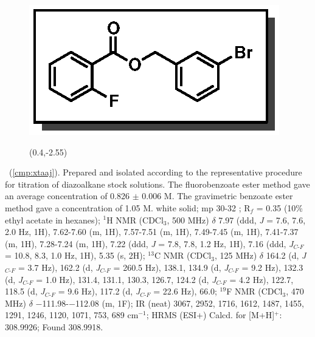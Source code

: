 \pagebreak
\begin{figure}
  \vspace{-16pt}
  \begin{center}
    \includegraphics[scale=0.8]{chp_asymmetric/images/xtaaj}
          \begin{textblock}{1}(0.4,-2.55)  \end{textblock}
  \end{center}
  \vspace{-35pt}
\end{figure}\noindent \textbf{\CMPxtaaj}\ (\ref{cmp:xtaaj}). Prepared and
isolated according to the representative procedure for titration of diazoalkane
stock solutions. The fluorobenzoate ester method gave an average concentration
of 0.826 $\pm$ 0.006 M. The gravimetric benzoate ester method gave a
concentration of 1.05 M. white solid; mp 30-32 \degc; R$_f$ = 0.35 (10\% ethyl
acetate in hexanes); $^1$H NMR (CDCl$_3$, 500 MHz) $\delta$ 7.97 (ddd, \textit{J} = 7.6,
7.6, 2.0 Hz, 1H), 7.62-7.60 (m, 1H), 7.57-7.51 (m, 1H), 7.49-7.45 (m, 1H),
7.41-7.37 (m, 1H), 7.28-7.24 (m, 1H), 7.22 (ddd, \textit{J} = 7.8, 7.8, 1.2 Hz,
1H), 7.16 (ddd, \textit{J}$_{C\mbox{-}F}$ = 10.8, 8.3, 1.0 Hz, 1H), 5.35 (s,
2H); $^{13}$C NMR (CDCl$_3$, 125 MHz) $\delta$ 164.2 (d,
\textit{J}$_{C\mbox{-}F}$ = 3.7 Hz), 162.2 (d, \textit{J}$_{C\mbox{-}F}$ = 260.5
Hz), 138.1, 134.9 (d, \textit{J}$_{C\mbox{-}F}$ = 9.2 Hz), 132.3 (d,
\textit{J}$_{C\mbox{-}F}$ = 1.0 Hz), 131.4, 131.1, 130.3, 126.7, 124.2 (d,
\textit{J}$_{C\mbox{-}F}$ = 4.2 Hz), 122.7, 118.5 (d, \textit{J}$_{C\mbox{-}F}$
= 9.6 Hz), 117.2 (d, \textit{J}$_{C\mbox{-}F}$ = 22.6 Hz), 66.0; $^{19}$F NMR
(CDCl$_3$, 470 MHz) $\delta$ $-$111.98-$-$112.08 (m, 1F); IR (neat) 3067, 2952,
1716, 1612, 1487, 1455, 1291, 1246, 1120, 1071, 753, 689 cm$^{-1}$; HRMS (ESI+)
Calcd. for  [M+H]$^+$: 308.9926; Found 308.9918.

